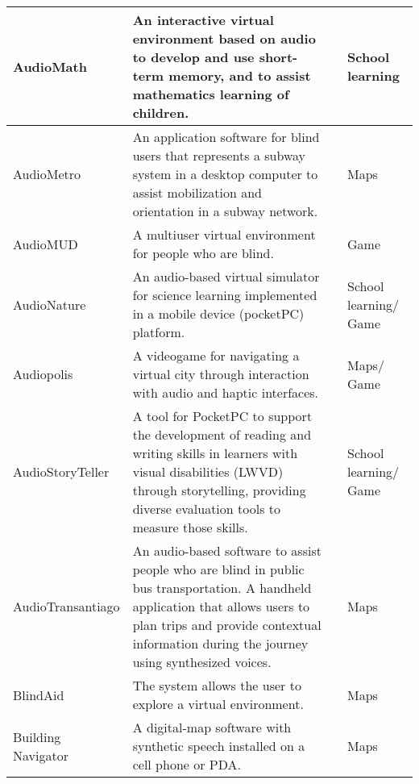 \begin{small}
\begin{longtable}[h]{m{2.5cm}m{5cm}m{3cm}m{2cm}}
            AudioMath & An interactive virtual environment based on audio to develop and use short-term memory, and to assist mathematics learning of children. & {\tiny \cite{Sanchez2005c}} & School learning \\ \hline
            
            AudioMetro & An application software for blind users that represents a subway system in a desktop computer to assist mobilization and orientation in a subway network. & {\tiny \cite{Sanchez2006}} & Maps \\ \hline
            
            AudioMUD & A multiuser virtual environment for people who are blind. & {\tiny \cite{Sanchez2007a}} & Game \\ \hline
            
            AudioNature & An audio-based virtual simulator for science learning implemented in a mobile device (pocketPC) platform. & {\tiny \cite{Sanchez2008}} & School learning$/$Game \\ \hline
            
            Audiopolis & A videogame for navigating a virtual city through interaction with audio and haptic interfaces. & {\tiny \cite{Sanchez2014a,Sanchez2011,201353,Sanchez2014Multimodal}} & Maps$/$Game \\ \hline
            
            AudioStoryTeller & A tool for PocketPC to support the development of reading and writing skills in learners with visual disabilities (LWVD) through storytelling, providing diverse evaluation tools to measure those skills. & {\tiny \cite{Sancheza}} & School learning$/$Game \\ \hline
            
            AudioTransantiago & An audio-based software to assist people who are blind in public bus transportation. A handheld application that allows users to plan trips and provide contextual information during the journey using synthesized voices. & {\tiny \cite{Sanchez2013,Sanchez2011a}} & Maps \\ \hline
            
            BlindAid & The system allows the user to explore a virtual environment. & {\tiny \cite{201219,Schloerb2015,Lahav2012}} & Maps \\ \hline
            
            Building Navigator & A digital-map software with synthetic speech installed on a cell phone or PDA. & {\tiny \cite{20105}} & Maps \\ \hline
            

\end{longtable}
\end{small}
